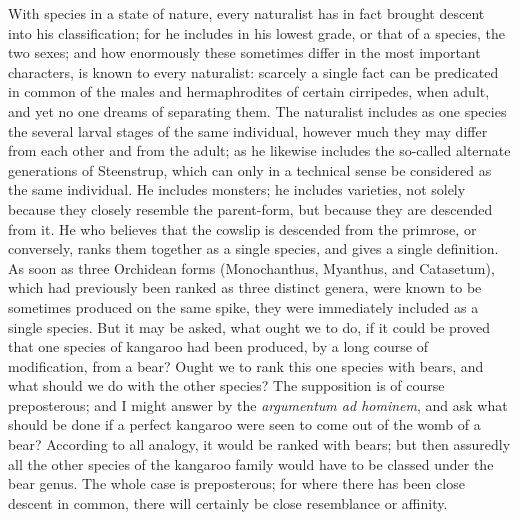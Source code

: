 \indent With species in a state of nature, every naturalist has in fact brought descent into his classification; for he includes in his lowest grade, or that of a species, the two sexes; and how enormously these sometimes differ in the most important characters, is known to every naturalist: scarcely a single fact can be predicated in common of the males and hermaphrodites of certain cirripedes, when adult, and yet no one dreams of separating them. The naturalist includes as one species the several larval stages of the same individual, however much they may differ from each other and from the adult; as he likewise includes the so-called alternate generations of Steenstrup, which can only in a technical sense be considered as the same individual. He includes monsters; he includes varieties, not solely because they closely resemble the parent-form, but because they are descended from it. He who believes that the cowslip is descended from the primrose, or conversely, ranks them together as a single species, and gives a single definition. As soon as three Orchidean forms (Monochanthus, Myanthus, and Catasetum), which had previously been ranked as three distinct genera, were known to be sometimes produced on the same spike, they were immediately included as a single species. But it may be asked, what ought we to do, if it could be proved that one species of kangaroo had been produced, by a long course of modification, from a bear? Ought we to rank this one species with bears, and what should we do with the other species? The supposition is of course preposterous; and I might answer by the \emph{argumentum ad hominem}, and ask what should be done if a perfect kangaroo were seen to come out of the womb of a bear? According to all analogy, it would be ranked with bears; but then assuredly all the other species of the kangaroo family would have to be classed under the bear genus. The whole case is preposterous; for where there has been close descent in common, there will certainly be close resemblance or affinity.~\\
